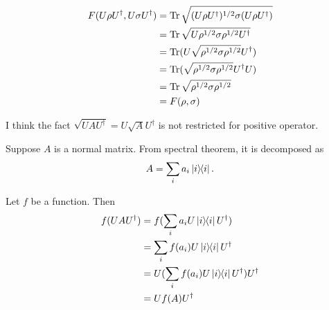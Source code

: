 
\begin{align*}
	F(U \rho U^\dagger, U \sigma U^\dagger) &= \operatorname{Tr} \sqrt{(U\rho U^\dagger)^{1/2} \sigma (U \rho U^\dagger)}\\
		&= \operatorname{Tr} \sqrt{U \rho^{1/2} \sigma \rho^{1/2} U^\dagger}\\
		&= \operatorname{Tr} (U \sqrt{\rho^{1/2} \sigma \rho^{1/2}} U^\dagger)\\
		&= \operatorname{Tr} (\sqrt{\rho^{1/2} \sigma \rho^{1/2}} U^\dagger U)\\
		&= \operatorname{Tr} \sqrt{\rho^{1/2} \sigma \rho^{1/2}}\\
		&= F(\rho, \sigma)
\end{align*}

\begin{screen}
	I think the fact $\sqrt{UAU^\dagger} = U\sqrt{A}U^\dagger$ is not restricted for positive operator.
	
	Suppose $A$ is a normal matrix. From spectral theorem, it is decomposed as
	\begin{align*}
		A = \sum_i a_i \ket{i}\hspace{-1mm} \bra{i}.
	\end{align*}
	
	Let $f$ be a function. Then
	\begin{align*}
		f(UAU^\dagger )&= f(\sum_i a_i U \ket{i}\hspace{-1mm} \bra{i} U^\dagger)\\
			&= \sum_i f(a_i) U \ket{i}\hspace{-1mm} \bra{i} U^\dagger\\
			&= U (\sum_i f(a_i) U \ket{i}\hspace{-1mm} \bra{i} U^\dagger) U^\dagger\\
			&= U f(A) U^\dagger
	\end{align*}
\end{screen}


